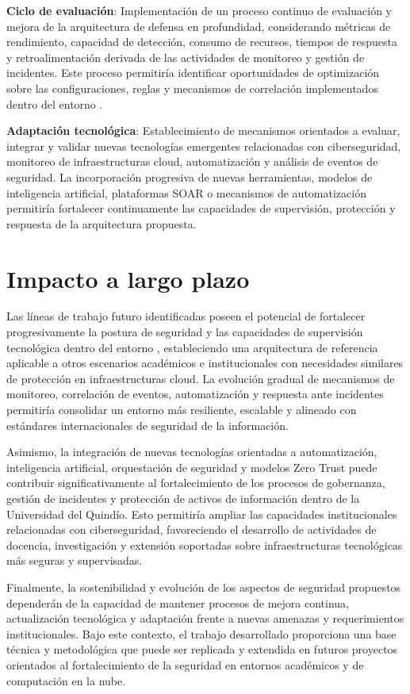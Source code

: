 \textbf{Ciclo de evaluación}:  
Implementación de un proceso continuo de evaluación y mejora de la arquitectura de defensa en profundidad, considerando métricas de 
rendimiento, capacidad de detección, consumo de recursos, tiempos de respuesta y retroalimentación derivada de las actividades de monitoreo
y gestión de incidentes. Este proceso permitiría identificar oportunidades de optimización sobre las configuraciones, reglas y mecanismos 
de correlación implementados dentro del entorno \GRID.

\textbf{Adaptación tecnológica}:  
Establecimiento de mecanismos orientados a evaluar, integrar y validar nuevas tecnologías emergentes relacionadas con ciberseguridad, 
monitoreo de infraestructuras cloud, automatización y análisis de eventos de seguridad. La incorporación progresiva de nuevas herramientas, 
modelos de inteligencia artificial, plataformas SOAR o mecanismos de automatización permitiría fortalecer continuamente las capacidades de 
supervisión, protección y respuesta de la arquitectura propuesta.

\section{Impacto a largo plazo}
\noindent

Las líneas de trabajo futuro identificadas poseen el potencial de fortalecer progresivamente la postura de seguridad y las capacidades de 
supervisión tecnológica dentro del entorno \GRID, estableciendo una arquitectura de referencia aplicable a otros escenarios académicos e 
institucionales con necesidades similares de protección en infraestructuras cloud. La evolución gradual de mecanismos de monitoreo, 
correlación de eventos, automatización y respuesta ante incidentes permitiría consolidar un entorno más resiliente, escalable y alineado 
con estándares internacionales de seguridad de la información.

Asimismo, la integración de nuevas tecnologías orientadas a automatización, inteligencia artificial, orquestación de seguridad y modelos 
Zero Trust puede contribuir significativamente al fortalecimiento de los procesos de gobernanza, gestión de incidentes y protección de 
activos de información dentro de la Universidad del Quindío. Esto permitiría ampliar las capacidades institucionales relacionadas con 
ciberseguridad, favoreciendo el desarrollo de actividades de docencia, investigación y extensión soportadas sobre infraestructuras 
tecnológicas más seguras y supervisadas.

Finalmente, la sostenibilidad y evolución de los aspectos de seguridad propuestos dependerán de la capacidad de mantener procesos de 
mejora continua, actualización tecnológica y adaptación frente a nuevas amenazas y requerimientos institucionales. Bajo este contexto, el 
trabajo desarrollado proporciona una base técnica y metodológica que puede ser replicada y extendida en futuros proyectos orientados al 
fortalecimiento de la seguridad en entornos académicos y de computación en la nube.
